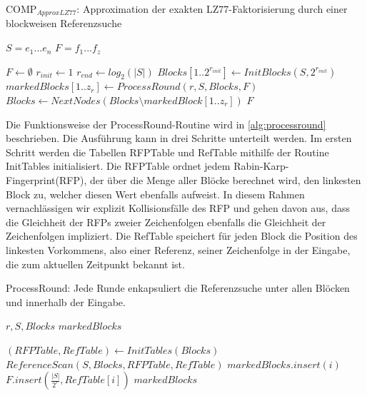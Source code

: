 \begin{algorithm}[ht]
\centering
\caption{COMP$_{ApproxLZ77}$: Approximation der exakten LZ77-Faktorisierung durch einer blockweisen Referenzsuche} \label{alg:compapproxlz77}
\algorithmicrequire $S=e_1...e_n$
\algorithmicensure $F=f_1...f_z$
\begin{algorithmic}[1]
    \STATE $F \gets \emptyset$
    \STATE $r_{init} \gets 1$
    \STATE $r_{end} \gets log_2(|S|)$
    \STATE $Blocks[1..2^{r_{init}}] \gets InitBlocks(S, 2^{r_{init}})$ 
        \STATE $markedBlocks[1..z_r] \gets ProcessRound(r, S, Blocks, F)$
        \STATE $Blocks \gets NextNodes(Blocks\setminus markedBlock[1..z_r])$ 
    \ENDFOR
    \RETURN $F$
\end{algorithmic}
\end{algorithm}

Die Funktionsweise der ProcessRound-Routine wird in \ref{alg:processround} beschrieben. Die Ausführung kann in drei Schritte unterteilt werden. Im ersten Schritt werden die Tabellen RFPTable und RefTable
mithilfe der Routine InitTables initialisiert. Die RFPTable ordnet jedem Rabin-Karp-Fingerprint(RFP), der über die Menge aller Blöcke berechnet wird, den linkesten Block zu, welcher diesen 
Wert ebenfalls aufweist. In diesem Rahmen vernachlässigen wir explizit Kollisionsfälle des RFP und gehen davon aus, dass die Gleichheit der RFPs zweier Zeichenfolgen ebenfalls die Gleichheit der Zeichenfolgen
impliziert. Die RefTable speichert für jeden Block die Position des linkesten Vorkommens, also einer Referenz, seiner Zeichenfolge in der Eingabe, die zum aktuellen Zeitpunkt bekannt ist.

\begin{algorithm}[ht]
    \centering
    \caption{ProcessRound: Jede Runde enkapsuliert die Referenzsuche unter allen Blöcken und innerhalb der Eingabe.} \label{alg:processround}
    \algorithmicrequire $r, S, Blocks$
    \algorithmicensure $markedBlocks$
    \begin{algorithmic}[1]
        \STATE $(RFPTable, RefTable) \gets InitTables(Blocks)$
        \STATE $ReferenceScan(S, Blocks, RFPTable, RefTable)$
                \STATE $markedBlocks.insert(i)$
                \STATE $F.insert(\frac{|S|}{2^r}, RefTable[i])$ 
            \ENDIF
        \ENDFOR
        \RETURN $markedBlocks$
    \end{algorithmic}
\end{algorithm}

